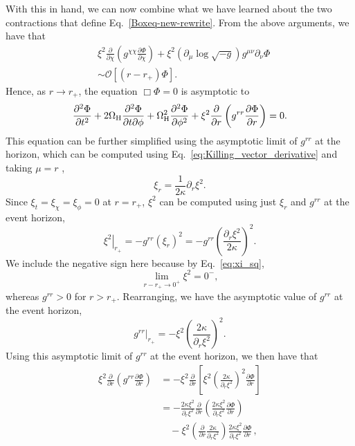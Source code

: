 \documentclass[aps,prx,amsmath,floats,floatfix,twocolumn,
  superscriptaddress,nofootinbib,showpacs]{revtex4-1}
\begin{document}
With this in hand, we can now combine what we have learned about the two contractions that define Eq.~\eqref{Boxeq-new-rewrite}. From the above arguments, we have that
\begin{equation}
\begin{split}
& \xi^2 \frac{\partial}{\partial \chi} \left( g^{\chi \chi} \frac{\partial \Phi}{\partial \chi} \right) + \xi^2 \left( \partial_{\mu} \log \sqrt{-g} \right) g^{\mu \nu} \partial_{\nu} \Phi \\
& \sim \mathcal{O}\left[ (r-r_+) \Phi \right]. 
\end{split}
\end{equation}
Hence, as $r \rightarrow r_+ $, the equation $\Box \Phi = 0 $ is asymptotic to 
\begin{equation}\label{eq:asymptotic_dAlembertian_01}
\frac{\partial^2 \Phi}{\partial t^2} + 2 \Omega_{\rm H} \frac{\partial^2 \Phi}{\partial t \partial \phi}  + \Omega_{\rm H}^2 \frac{\partial^2 \Phi}{\partial \phi^2} + \xi^2 \frac{\partial}{\partial r} \left( g^{rr} \frac{\partial \Phi}{\partial r} \right) = 0. 
\end{equation}
This equation can be further simplified using the asymptotic limit of $g^{rr}$ at the horizon, which can be computed using  Eq.~\eqref{eq:Killing_vector_derivative} and taking $\mu = r$ \cite{Cano_Ruiperez_2019}, 
\begin{equation}
\xi_r = \frac{1}{2 \kappa} \partial_r \xi^2. 
\end{equation}
Since $\xi_t = \xi_{\chi} = \xi_{\phi} = 0 $ at $r=r_+$, $\xi^2 $ can be computed using just $\xi_r$ and $g^{rr}$ at the event horizon,
\begin{equation}
\left.\xi^2\right|_{r_+} = - g^{rr} \left( \xi_r \right)^2 = - g^{rr} \left( \frac{\partial_r \xi^2}{2 \kappa}  \right)^2. 
\end{equation}
We include the negative sign here because by Eq.~\eqref{eq:xi_sq}, 
\begin{equation}
\lim_{r-r_+ \rightarrow 0^{+}} \xi^2 = 0^{-}, 
\end{equation}
whereas $g^{rr} > 0 $ for $r>r_+$. 
Rearranging, we have the asymptotic value of $g^{rr}$ at the event horizon, 
\begin{equation}
\left.g^{rr}\right|_{r_+} = -\xi^2 \left( \frac{2 \kappa }{\partial_r \xi^2}  \right)^2. 
\end{equation}
Using this asymptotic limit of $g^{rr}$ at the event horizon, we then have that
\begin{align}
 \xi^2 \frac{\partial}{\partial r} \left( g^{rr} \frac{\partial \Phi}{\partial r} \right)  &= - \xi^2 \frac{\partial}{\partial r} \left[ \xi^2 \left( \frac{2 \kappa }{\partial_r \xi^2}  \right)^2 \frac{\partial \Phi}{\partial r} \right] \\
& = - \frac{2 \kappa\xi^2}{\partial_r \xi^2} \frac{\partial}{\partial r} \left( \frac{2 \kappa \xi^2 }{\partial_r \xi^2} \frac{\partial \Phi}{\partial r} \right) 
\nonumber \\
 & \quad - \xi^2 \left( \frac{\partial}{\partial r} \frac{2 \kappa}{\partial_r \xi^2}  \right) \frac{2 \kappa \xi^2 }{\partial_r \xi^2} \frac{\partial \Phi}{\partial r}\,,
\end{align}
\end{document}
